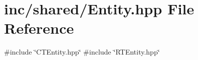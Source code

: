 \section{inc/shared/\+Entity.hpp File Reference}
\label{_entity_8hpp}
{\ttfamily \#include \char`\"{}C\+T\+Entity.\+hpp\char`\"{}}\newline
{\ttfamily \#include \char`\"{}R\+T\+Entity.\+hpp\char`\"{}}\newline
